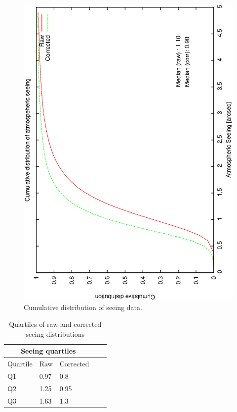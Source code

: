 {{\begin{figure}[htbp]
\begin{center}
    \includegraphics[scale=0.4, angle=-90]{figures/ecs/cum_seeing_dist.eps}
\end{center}  
\caption[Cumulative distribution of seeing data.]
{Cumulative distribution of seeing data.}
\label{fig:see_cum_dist}
\end{figure}


\begin{table}[htbp]
\begin{center}
\begin{tabular}{lllll}
\toprule
\multicolumn{3}{c}{Seeing quartiles} \\
\midrule
Quartile & Raw & Corrected \\
\midrule
Q1 & 0.97 & 0.8  \\
Q2 & 1.25 & 0.95 \\
Q3 & 1.63 & 1.3  \\
\bottomrule
\end{tabular}
\end{center}
\caption[Quartiles of raw and corrected seeing distributions]
{Quartiles of raw and corrected seeing distributions}
\label{tab:seeing_quartiles}
\end{table}


}}

